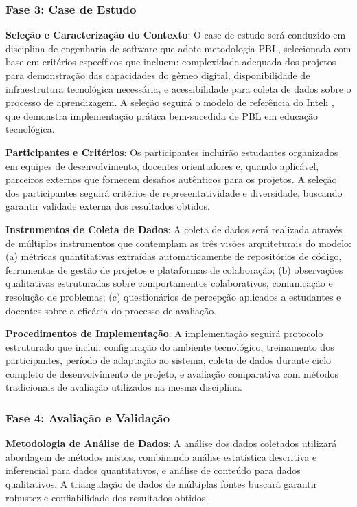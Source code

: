 \documentclass[12pt, a4paper, oneside]{abntex2}
\begin{document}
\subsubsection{Fase 3: Case de Estudo}

\textbf{Seleção e Caracterização do Contexto}: O case de estudo será conduzido em disciplina de engenharia de software que adote metodologia PBL, selecionada com base em critérios específicos que incluem: complexidade adequada dos projetos para demonstração das capacidades do gêmeo digital, disponibilidade de infraestrutura tecnológica necessária, e acessibilidade para coleta de dados sobre o processo de aprendizagem. A seleção seguirá o modelo de referência do Inteli \cite{inteli2024}, que demonstra implementação prática bem-sucedida de PBL em educação tecnológica.

\textbf{Participantes e Critérios}: Os participantes incluirão estudantes organizados em equipes de desenvolvimento, docentes orientadores e, quando aplicável, parceiros externos que fornecem desafios autênticos para os projetos. A seleção dos participantes seguirá critérios de representatividade e diversidade, buscando garantir validade externa dos resultados obtidos.

\textbf{Instrumentos de Coleta de Dados}: A coleta de dados será realizada através de múltiplos instrumentos que contemplam as três visões arquiteturais do modelo: (a) métricas quantitativas extraídas automaticamente de repositórios de código, ferramentas de gestão de projetos e plataformas de colaboração; (b) observações qualitativas estruturadas sobre comportamentos colaborativos, comunicação e resolução de problemas; (c) questionários de percepção aplicados a estudantes e docentes sobre a eficácia do processo de avaliação.

\textbf{Procedimentos de Implementação}: A implementação seguirá protocolo estruturado que inclui: configuração do ambiente tecnológico, treinamento dos participantes, período de adaptação ao sistema, coleta de dados durante ciclo completo de desenvolvimento de projeto, e avaliação comparativa com métodos tradicionais de avaliação utilizados na mesma disciplina.

\subsubsection{Fase 4: Avaliação e Validação}

\textbf{Metodologia de Análise de Dados}: A análise dos dados coletados utilizará abordagem de métodos mistos, combinando análise estatística descritiva e inferencial para dados quantitativos, e análise de conteúdo para dados qualitativos. A triangulação de dados de múltiplas fontes buscará garantir robustez e confiabilidade dos resultados obtidos.
\end{document}
